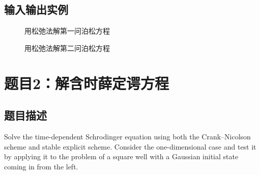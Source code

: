 \documentclass[11pt]{article}
\begin{document}
\subsection{输入输出实例}
\begin{figure}[htbp]
	\centering
	\caption{用松弛法解第一问泊松方程}
	\label{fig：用松弛法解第一问泊松方程}
\end{figure}
\begin{figure}[htbp]
	\centering
	\caption{用松弛法解第二问泊松方程}
	\label{fig：用松弛法解第二问泊松方程}
\end{figure}


\section{题目2：解含时薛定谔方程}
\subsection{题目描述}
Solve the time-dependent Schrodinger equation using both the Crank–Nicolson scheme and stable explicit scheme. Consider the one-dimensional case and test it by applying it to the problem of a square well with a Gaussian initial state coming in from the left.
\end{document}
